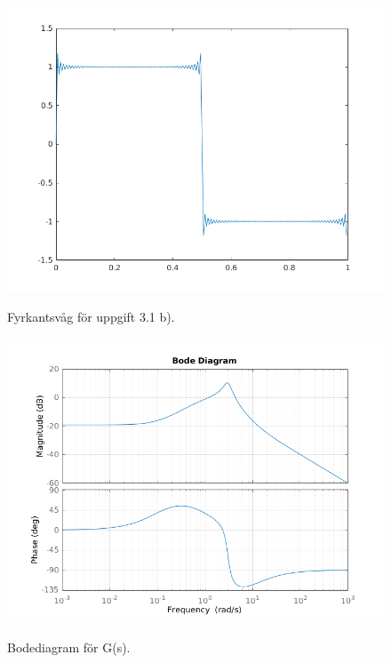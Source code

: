 \begin{figure}
    \caption{Fyrkantsvåg för uppgift 3.1 b).}
    \centering
    \includegraphics[scale=0.75]{figures/task1b.png}
    \label{fig:task1b}
\end{figure}

\begin{figure}
    \caption{Bodediagram för G(s).}
    \centering
    \includegraphics[scale=0.8]{figures/task2a-bode.png}
    \label{fig:task2a-bode}
\end{figure}


